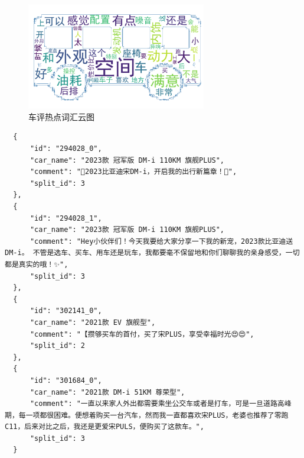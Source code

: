     \begin{figure}[H]
        \centering
        \includegraphics[width=0.7\textwidth,keepaspectratio=false]{pictures/32.png} %
        \caption{车评热点词汇云图}
      \end{figure}

      \begin{mdframed}[backgroundcolor=lightgray!20, linecolor=darkgray, linewidth=1pt]
  \begin{verbatim}
  {
      "id": "294028_0",
      "car_name": "2023款 冠军版 DM-i 110KM 旗舰PLUS",
      "comment": "🚗2023比亚迪宋DM-i，开启我的出行新篇章！🚗",
      "split_id": 3
  },
  {
      "id": "294028_1",
      "car_name": "2023款 冠军版 DM-i 110KM 旗舰PLUS",
      "comment": "Hey小伙伴们！今天我要给大家分享一下我的新宠，2023款比亚迪送DM-i。 不管是选车、买车、用车还是玩车，我都要毫不保留地和你们聊聊我的亲身感受，一切都是真实的哦！✨",
      "split_id": 3
  },
  {
      "id": "302141_0",
      "car_name": "2021款 EV 旗舰型",
      "comment": "【攒够买车的首付，买了宋PLUS，享受幸福时光😍😍",
      "split_id": 2
  },
  {
      "id": "301684_0",
      "car_name": "2021款 DM-i 51KM 尊荣型",
      "comment": "一直以来家人外出都需要乘坐公交车或者是打车，可是一旦道路高峰期，每一项都很困难。便想着购买一台汽车，然而我一直都喜欢宋PLUS，老婆也推荐了零跑C11，后来对比之后，我还是更爱宋PULS，便购买了这款车。",
      "split_id": 3
  }
\end{verbatim}
  \end{mdframed}